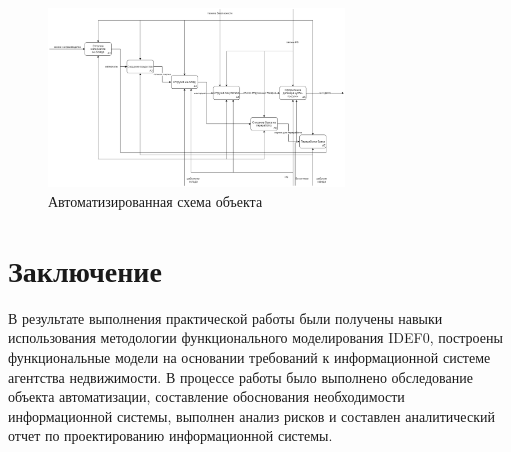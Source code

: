 \begin{figure}[h!]
        \centering
        \includegraphics[width=0.7\textwidth]{images/3/idef2.eps}
        \caption{Автоматизированная схема объекта}
\end{figure}

\section{Заключение}

В результате выполнения практической работы были получены навыки использования методологии функционального моделирования IDEF0, построены функциональные модели на основании требований к информационной системе агентства недвижимости. В процессе работы было выполнено обследование объекта автоматизации, составление обоснования необходимости информационной системы, выполнен анализ рисков и составлен аналитический отчет по проектированию информационной системы. 

